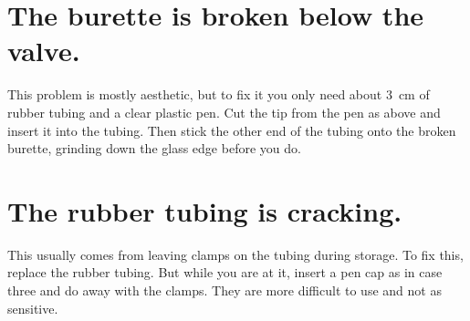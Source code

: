 \section{The burette is broken below the valve.}
This problem is mostly aesthetic, 
but to fix it you only need about 3~cm of rubber tubing 
and a clear plastic pen. 
Cut the tip from the pen as above and insert it into the tubing. 
Then stick the other end of the tubing onto the broken burette, 
grinding down the glass edge before you do.

\section{The rubber tubing is cracking.}
This usually comes from leaving clamps on the tubing during storage. 
To fix this, 
replace the rubber tubing. 
But while you are at it, 
insert a pen cap as in case three and do away with the clamps. 
They are more difficult to use and not as sensitive.
